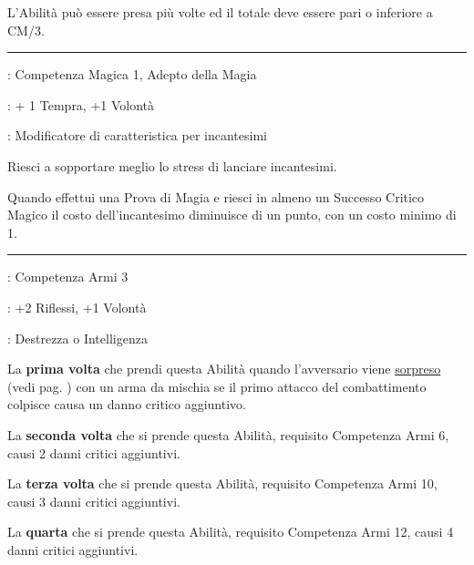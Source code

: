 \begin{multicols}{2}
L'Abilità può essere presa più volte ed il totale deve essere pari o inferiore a CM/3.

\smallskip\noindent\rule{\linewidth}{2pt} \hypertarget{Batteria Estesa}{}\medskip{}
\noindent
\begin{description}[noitemsep, topsep=0pt, parsep=0pt, partopsep=0pt, leftmargin=0cm, labelwidth=2.5cm]
    \item[\textbf{Requisito}]: Competenza Magica 1, Adepto della Magia
    \item[\textbf{Tiri Salvezza}]: + 1 Tempra, +1 Volontà
    \item[\textbf{Caratteristica}]: Modificatore di caratteristica per incantesimi
\end{description}

Riesci a sopportare meglio lo stress di lanciare incantesimi.

Quando effettui una Prova di Magia e riesci in almeno un Successo Critico Magico il costo dell'incantesimo diminuisce di un punto, con un costo minimo di 1.

\smallskip\noindent\rule{\linewidth}{2pt} \hypertarget{Colpo Furtivo}{}\medskip{}
\noindent
\begin{description}[noitemsep, topsep=0pt, parsep=0pt, partopsep=0pt, leftmargin=0cm, labelwidth=2.5cm]
    \item[\textbf{Requisito}]: Competenza Armi 3
    \item[\textbf{Tiri Salvezza}]: +2 Riflessi, +1 Volontà
    \item[\textbf{Caratteristica}]: Destrezza o Intelligenza
\end{description}

La \textbf{prima volta} che prendi questa Abilità quando l'avversario viene \hyperlink{sorpresa}{sorpreso} (vedi pag. \pageref{coltidisorpresa}) con un arma da mischia se il primo attacco del combattimento colpisce causa un danno critico aggiuntivo.

La \textbf{seconda volta} che si prende questa Abilità, requisito Competenza Armi 6, causi 2 danni critici aggiuntivi.

La \textbf{terza volta} che si prende questa Abilità, requisito Competenza Armi 10, causi 3 danni critici aggiuntivi.

La \textbf{quarta} che si prende questa Abilità, requisito Competenza Armi 12, causi 4 danni critici aggiuntivi.


\end{multicols}
